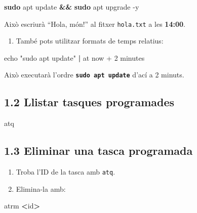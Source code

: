 \documentclass[
  12 pt,
  a4paper,
]{article}
\newenvironment{Shaded}{\begin{snugshade}}{\end{snugshade}}
\newcommand{\AttributeTok}[1]{\textcolor[rgb]{0.13,0.29,0.53}{#1}}
\newcommand{\BuiltInTok}[1]{#1}
\newcommand{\ExtensionTok}[1]{#1}
\newcommand{\FunctionTok}[1]{\textcolor[rgb]{0.13,0.29,0.53}{\textbf{#1}}}
\newcommand{\KeywordTok}[1]{\textcolor[rgb]{0.13,0.29,0.53}{\textbf{#1}}}
\newcommand{\NormalTok}[1]{#1}
\newcommand{\OperatorTok}[1]{\textcolor[rgb]{0.81,0.36,0.00}{\textbf{#1}}}
\newcommand{\StringTok}[1]{\textcolor[rgb]{0.31,0.60,0.02}{#1}}
\providecommand{\tightlist}{%
  \setlength{\itemsep}{0pt}\setlength{\parskip}{0pt}}
\begin{document}
\begin{Shaded}
\begin{Highlighting}[]
\FunctionTok{sudo}\NormalTok{ apt update }\KeywordTok{\&\&} \FunctionTok{sudo}\NormalTok{ apt upgrade }\AttributeTok{{-}y}
\end{Highlighting}
\end{Shaded}

Això escriurà ``Hola, món!'' al fitxer \texttt{hola.txt} a les
\textbf{14:00}.

\begin{enumerate}
\def\labelenumi{\arabic{enumi}.}
\setcounter{enumi}{1}
\tightlist
\item
  També pots utilitzar formats de temps relatius:
\end{enumerate}

\begin{Shaded}
\begin{Highlighting}[]
\BuiltInTok{echo} \StringTok{"sudo apt update"} \KeywordTok{|} \ExtensionTok{at}\NormalTok{ now + 2 minutes}
\end{Highlighting}
\end{Shaded}

Això executarà l'ordre \textbf{\texttt{sudo\ apt\ update}} d'ací a 2
minuts.

\subsection{1.2 Llistar tasques
programades}\label{llistar-tasques-programades}

\begin{Shaded}
\begin{Highlighting}[]
\ExtensionTok{atq}
\end{Highlighting}
\end{Shaded}

\subsection{1.3 Eliminar una tasca
programada}\label{eliminar-una-tasca-programada}

\begin{enumerate}
\def\labelenumi{\arabic{enumi}.}
\item
  Troba l'ID de la tasca amb \texttt{atq}.
\item
  Elimina-la amb:
\end{enumerate}

\begin{Shaded}
\begin{Highlighting}[]
\ExtensionTok{atrm} \OperatorTok{\textless{}}\NormalTok{id}\OperatorTok{\textgreater{}}
\end{Highlighting}
\end{Shaded}
\end{document}
